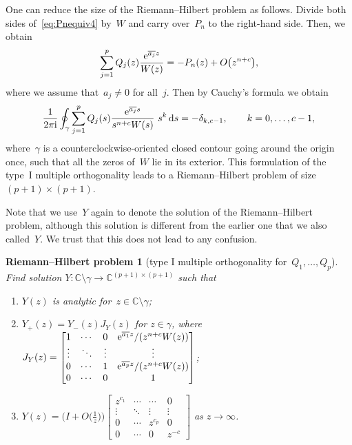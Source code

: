 \documentclass[pdftex]{sigma}
\numberwithin{equation}{section}
\newtheorem*{rhproblem}{Riemann--Hilbert problem}
{ \theoremstyle{definition}
 \newtheorem{Definition}[Theorem]{Definition}
 \newtheorem{Note}[Theorem]{Note}
 \newtheorem{Example}[Theorem]{Example}
 \newtheorem{Remark}[Theorem]{Remark}
}
\newcommand*{\Cset}{\mathbb{C}} %
\begin{document}
 One can reduce the size of the Riemann--Hilbert problem as follows. Divide both sides of~\eqref{eq:Pnequiv4} by~$W$ and carry over~$P_n$ to the right-hand side. Then, we obtain
 \begin{equation}
 \label{eq:Pnequiv6}
 \sum_{j=1}^p Q_j(z) \frac{{\rm e}^{\overline{a_j}z}}{W(z)} = -P_n(z) + O\big(z^{n+c}\big),
 \end{equation}
 where we assume that~$a_j \neq 0$ for all~$j$. Then by Cauchy's formula we obtain
 \begin{equation}
 \label{eq:Pnequiv7}
 \frac{1}{2\pi {\rm i}}\oint_\gamma \sum_{j=1}^p Q_j(s) \frac{{\rm e}^{\overline{a_j} s}}{s^{n+c} W(s)}\ s^k\, {\rm d}s = - \delta_{k,c-1}, \qquad k=0, \dots, c-1,
 \end{equation}
 where~$\gamma$ is a counterclockwise-oriented closed contour going around the origin once, such that all the zeros of~$W$ lie in its exterior. This formulation of the type~I multiple orthogonality leads to a Riemann--Hilbert problem of size~$(p+1) \times (p+1)$.

 Note that we use~$Y$ again to denote the solution of the Riemann--Hilbert problem, although this solution is different from the earlier one that we also called~$Y$. We trust that this does not lead to any confusion.

 \begin{rhproblem}[type I multiple orthogonality for~$Q_1, \dots, Q_p$]
 Find solution $Y\colon \Cset \setminus \gamma \to \Cset^{(p+1) \times (p+1)}$ such that
 \begin{enumerate}
 \item[$(1)$] $Y(z)$ is analytic for~$z \in \Cset \setminus \gamma$;
 \item[$(2)$] $Y_+(z) = Y_-(z) J_Y(z)$ for $z \in \gamma$, where
$
 J_Y(z) =
 \begin{bmatrix}
 1 & \cdots &0& {\rm e}^{\overline{a_1} z}/(z^{n+c} W(z))\\
 \vdots &\ddots&\vdots&\vdots\\
 0 & \cdots &1& {\rm e}^{\overline{a_p} z}/(z^{n+c} W(z))\\
 0&\cdots&0& 1
 \end{bmatrix}$;

 \item[$(3)$] $Y(z) = \big(I + O\big(\frac{1}{z}\big)\big)
 \begin{bmatrix}
 z^{c_1}&\cdots&\cdots& 0\\
 \vdots& \ddots&\vdots&\vdots\\
 0&\cdots&z^{c_p}&0\\
 0&\cdots&0&z^{-c}
 \end{bmatrix}$ as $z \to \infty$.
 \end{enumerate}
 \end{rhproblem}
\end{document}
